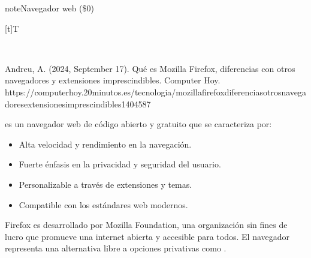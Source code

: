 \documentclass[letterpaper,10pt,spanish]{sphinxmanual}
\let\sphinxpxdimen\pdfpxdimen\else\newdimen\sphinxpxdimen
\begin{document}
\begin{sphinxadmonition}{note}{Navegador web  (\$0)}


\begin{savenotes}\sphinxattablestart
\sphinxthistablewithglobalstyle
\centering
\begin{tabulary}{\linewidth}[t]{T}
\sphinxtoprule
\sphinxtableatstartofbodyhook

\begin{sphinxfigure-in-table}
\centering
\capstart
\noindent\sphinxincludegraphics[width=360\sphinxpxdimen]{{image024}.png}
\label{\detokenize{1_guias/10ofimatica/G1012:id42}}\end{sphinxfigure-in-table}\relax
\\
\sphinxbottomrule
\end{tabulary}
\sphinxtableafterendhook\par
\sphinxattableend\end{savenotes}

\sphinxAtStartPar
%
\begin{footnote}[4]\sphinxAtStartFootnote
Andreu, A. (2024, September 17). Qué es Mozilla Firefox, diferencias con otros navegadores y extensiones imprescindibles. Computer Hoy. https://computerhoy.20minutos.es/tecnologia/mozilla\sphinxhyphen{}firefox\sphinxhyphen{}diferencias\sphinxhyphen{}otros\sphinxhyphen{}navegadores\sphinxhyphen{}extensiones\sphinxhyphen{}imprescindibles\sphinxhyphen{}1404587
%
\end{footnote}  es un navegador web de código abierto y gratuito que se caracteriza por:
\begin{itemize}
\item {} 
\sphinxAtStartPar
Alta velocidad y rendimiento en la navegación.

\item {} 
\sphinxAtStartPar
Fuerte énfasis en la privacidad y seguridad del usuario.

\item {} 
\sphinxAtStartPar
Personalizable a través de extensiones y temas.

\item {} 
\sphinxAtStartPar
Compatible con los estándares web modernos.

\end{itemize}

\sphinxAtStartPar
Firefox es desarrollado por Mozilla Foundation, una organización sin fines de lucro que promueve una internet abierta y accesible para todos. El navegador representa una alternativa libre a opciones privativas como .
\end{sphinxadmonition}
\end{document}
